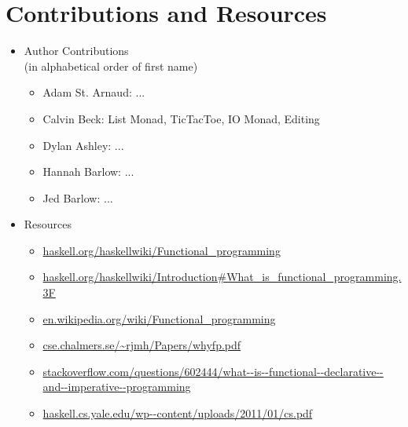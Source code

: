 \documentclass[]{beamer}
\begin{document}
\begin{frame}
\maketitle
\end{frame}





\section{Contributions and Resources}
\begin{frame}[fragile]
    \begin{itemize}
        \item Author Contributions\\{\scriptsize(in alphabetical order of first name)}
            \begin{itemize}
                \item Adam St. Arnaud:
                    ...
                \item Calvin Beck:
                    List Monad, TicTacToe, IO Monad, Editing
                \item Dylan Ashley:
                    ...
                \item Hannah Barlow:
                    ...
                \item Jed Barlow:
                    ...
            \end{itemize}
        \item Resources
            \begin{itemize}
                \item \url{haskell.org/haskellwiki/Functional_programming}
                \item \url{haskell.org/haskellwiki/Introduction#What_is_functional_programming.3F}
                \item \url{en.wikipedia.org/wiki/Functional_programming}
                \item \url{cse.chalmers.se/~rjmh/Papers/whyfp.pdf}
                \item \url{stackoverflow.com/questions/602444/what--is--functional--declarative--and--imperative--programming}
                \item \url{haskell.cs.yale.edu/wp--content/uploads/2011/01/cs.pdf}
            \end{itemize}
    \end{itemize}
\end{frame}
\end{document}
